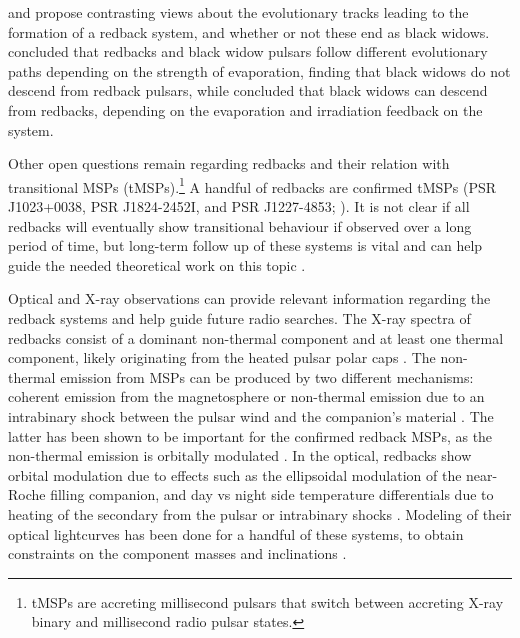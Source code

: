 \documentclass[fleqn,usenatbib,useAMS,letters]{mnras}
\begin{document}
\cite{ChenFormationRedback2013} and \cite{Benvenuto2014} propose contrasting views about the evolutionary tracks leading to the formation of a redback system, and whether or not these end as black widows. %
\cite{ChenFormationRedback2013} concluded that redbacks and  black  widow  pulsars  follow  different  evolutionary  paths depending  on  the  strength  of  evaporation,  finding  that  black widows  do  not  descend  from  redback  pulsars, while \cite{Benvenuto2014} concluded that black widows can descend from redbacks, depending on the evaporation  and  irradiation  feedback on the system. 

Other open questions remain regarding redbacks and their relation with transitional MSPs (tMSPs).\footnote{tMSPs are accreting millisecond pulsars that switch between accreting X-ray binary and millisecond radio pulsar states.} A handful of %
redbacks are 
 confirmed tMSPs (PSR J1023+0038, PSR J1824-2452I, and PSR J1227-4853;  \citealt{Archibal09,Papitto13,bassa2014change}).  It is not clear if all redbacks will eventually show transitional behaviour if observed over a long period of time, but long-term follow up of these systems is vital and can help guide the needed theoretical work on this topic
.


Optical and X-ray observations can provide relevant information regarding the redback systems and help guide future radio searches. The X-ray spectra of redbacks consist of a dominant non-thermal component and at least one thermal component, likely originating from the heated pulsar polar caps \citep{Zavlin96,Zavlin02,Bogdanov05,Bogdanov2011Pulsar}. The non-thermal emission from MSPs can be produced by two different mechanisms: coherent emission from the magnetosphere or non-thermal emission due to an intrabinary shock between the pulsar wind and the companion's material \citep{2003SciStapper}. The latter has been shown to be important for the confirmed redback MSPs, as the non-thermal emission is orbitally modulated \citep{Bogdanov05,bogdanov_chandra_2010,Bogdanov2011Pulsar}. In the optical, redbacks show orbital modulation due to effects such as the ellipsoidal modulation of the near-Roche filling companion, and day vs night side temperature differentials due to heating of the secondary from the pulsar or intrabinary shocks \cite[e.g.][]{Callanan95,Romani16,Cho2018}. Modeling of their optical lightcurves has been done for a handful of these systems, to obtain constraints on the component masses and  inclinations \citep{Thorstensen2005,Cho2018,Strader2019Redbacks}.
\end{document}
